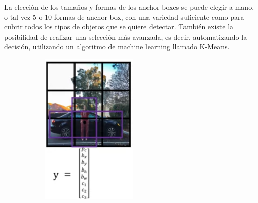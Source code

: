 La elección de los tamaños y formas de los anchor boxes se puede elegir a mano, o tal vez 5 o 10 formas de anchor box, con una variedad suficiente como para cubrir todos los tipos de objetos que se quiere detectar.
También existe la posibilidad de realizar una selección más avanzada, es decir, automatizando la decisión, utilizando un algoritmo de machine learning llamado K-Means.

\begin{figure}[p]
    \centering
    \begin{subfigure}[h!]{.4\textwidth}
        \centering
        \includegraphics[width=\linewidth]{img/anchor-boxes-yolo-1.png}

\end{subfigure}
\end{figure}
